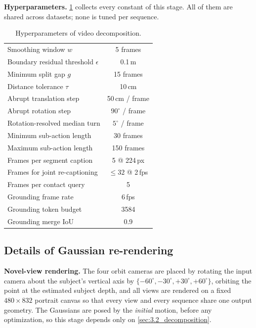 \noindent\textbf{Hyperparameters.}
\cref{tab:supp_decomposition_hparams} collects every constant of this stage.
All of them are shared across datasets; none is tuned per sequence.

\begin{table}[t]
\centering
\small
\begin{tabular}{lc}
\toprule
Smoothing window $w$ & 5 frames \\
Boundary residual threshold $\epsilon$ & 0.1\,m \\
Minimum split gap $g$ & 15 frames \\
Distance tolerance $\tau$ & 10\,cm \\
Abrupt translation step & 50\,cm / frame \\
Abrupt rotation step & $90^\circ$ / frame \\
Rotation-resolved median turn & $5^\circ$ / frame \\
Minimum sub-action length & 30 frames \\
Maximum sub-action length & 150 frames \\
\midrule
Frames per segment caption & 5 @ 224\,px \\
Frames for joint re-captioning & $\le32$ @ 2\,fps \\
Frames per contact query & 5 \\
Grounding frame rate & 6\,fps \\
Grounding token budget & 3584 \\
Grounding merge IoU & 0.9 \\
\bottomrule
\end{tabular}
\caption{Hyperparameters of video decomposition.}
\label{tab:supp_decomposition_hparams}
\end{table}

\subsection{Details of Gaussian re-rendering}
\label{sec:supp_rerendering}

\noindent\textbf{Novel-view rendering.}
The four orbit cameras are placed by rotating the input camera about the
subject's vertical axis by $\{-60^{\circ},-30^{\circ},+30^{\circ},+60^{\circ}\}$,
orbiting the point at the estimated subject depth, and all views are rendered on
a fixed $480\times832$ portrait canvas so that every view and every sequence
share one output geometry.
The Gaussians are posed by the \emph{initial} motion, before any optimization,
so this stage depends only on \cref{sec:3.2_decomposition}.

